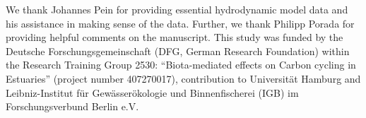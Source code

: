 \documentclass[npg, manuscript]{copernicus}
\begin{document}
\noappendix       %





\appendixtables   %









\begin{acknowledgements}
We thank Johannes Pein for providing essential hydrodynamic model data and his assistance in making sense of the data.
Further, we thank Philipp Porada for providing helpful comments on the manuscript.
This study was funded by the Deutsche Forschungsgemeinschaft (DFG, German Research Foundation) within the Research Training Group 2530: “Biota-mediated effects on Carbon cycling in Estuaries” (project number 407270017), contribution to Universität Hamburg and Leibniz-Institut für Gewässerökologie und Binnenfischerei (IGB) im Forschungsverbund Berlin e.V.
\end{acknowledgements}
\end{document}
